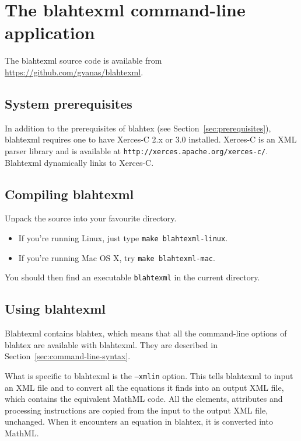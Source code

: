 \documentclass{article}
\begin{document}
\section{The blahtexml command-line application}\label{sec:blahtexml}

The blahtexml source code is available from \url{https://github.com/gvanas/blahtexml}.

\subsection{System prerequisites}\label{sec:blahtexml-prerequisites}

In addition to the prerequisites of blahtex (see Section~\ref{sec:prerequisites}), blahtexml requires one to have Xerces-C 2.x or 3.0 installed. Xerces-C is an XML parser library and is available at \texttt{http://xerces.apache.org/xerces-c/}. Blahtexml dynamically links to Xerces-C.

\subsection{Compiling blahtexml}\label{sec:compiling-blahtexml}

Unpack the source into your favourite directory.
\begin{itemize}
\item If you're running Linux, just type \texttt{make blahtexml-linux}.
\item If you're running Mac OS X, try \texttt{make blahtexml-mac}.
\end{itemize}
You should then find an executable \texttt{blahtexml} in the current directory.

\subsection{Using blahtexml}\label{sec:blahtexml-command-line-syntax}

Blahtexml contains blahtex, which means that all the command-line options of blahtex are available with blahtexml. They are described in Section~\ref{sec:command-line-syntax}.

What is specific to blahtexml is the \texttt{--xmlin} option. This tells blahtexml to input an XML file and to convert all the equations it finds into an output XML file, which contains the equivalent MathML code. All the elements, attributes and processing instructions are copied from the input to the output XML file, unchanged. When it encounters an equation in blahtex, it is converted into MathML.
\end{document}
